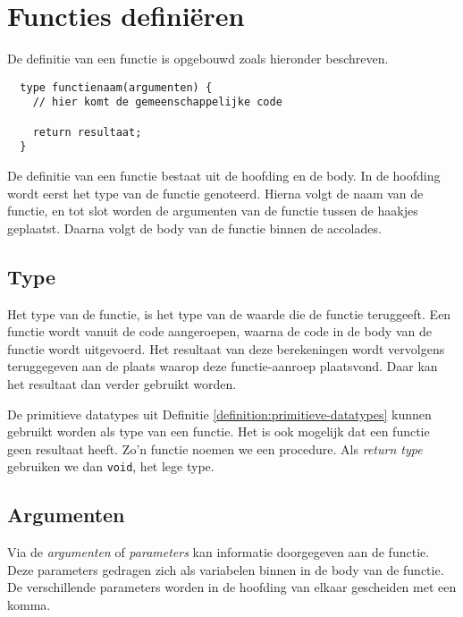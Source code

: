 \documentclass[11pt,fleqn]{book} %
\begin{document}
\section{Functies definiëren}
De definitie van een functie is opgebouwd zoals hieronder beschreven.
\begin{definition}[Functie]
	\phantom{ }
	\begin{verbatim}
  type functienaam(argumenten) {
    // hier komt de gemeenschappelijke code
    
    return resultaat;
  }
	\end{verbatim}
	\vspace{0cm}
\end{definition}
\noindent
De definitie van een functie bestaat uit de hoofding en de body. In de hoofding wordt eerst het type van de functie genoteerd. Hierna volgt de naam van de functie, en tot slot worden de argumenten van de functie tussen de haakjes geplaatst. Daarna volgt de body van de functie binnen de accolades.

\subsection{Type}
Het type van de functie, is het type van de waarde die de functie teruggeeft. Een functie wordt vanuit de code aangeroepen, waarna de code in de body van de functie wordt uitgevoerd. Het resultaat van deze berekeningen wordt vervolgens teruggegeven aan de plaats waarop deze functie-aanroep plaatsvond. Daar kan het resultaat dan verder gebruikt worden.

De primitieve datatypes uit Definitie \ref{definition:primitieve-datatypes} kunnen gebruikt worden als type van een functie. Het is ook mogelijk dat een functie geen resultaat heeft. Zo'n functie noemen we een procedure. Als \emph{return type} gebruiken we dan \texttt{void}, het lege type.


\subsection{Argumenten}
Via de \emph{argumenten} of \emph{parameters} kan informatie doorgegeven aan de functie. Deze parameters gedragen zich als variabelen binnen in de body van de functie. De verschillende parameters worden in de hoofding van elkaar gescheiden met een komma.
\end{document}
